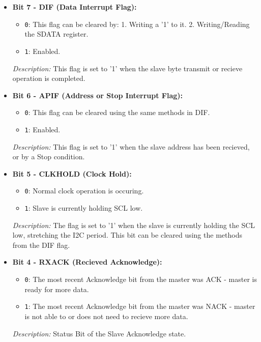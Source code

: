     
    \begin{itemize}
        \item \textbf{Bit 7 - DIF (Data Interrupt Flag):} 
        \begin{itemize}
            \item \texttt{0}: This flag can be cleared by: 1. Writing a '1' to it. 2. Writing/Reading the SDATA register.
            \item \texttt{1}: Enabled.
        \end{itemize}
        \textit{Description:} This flag is set to '1' when the slave byte transmit or recieve operation is completed.
        
        \item \textbf{Bit 6 - APIF (Address or Stop Interrupt Flag):} 
        \begin{itemize}
            \item \texttt{0}: This flag can be cleared using the same methods in DIF.
            \item \texttt{1}: Enabled.
        \end{itemize}
        \textit{Description:} This flag is set to '1' when the slave address has been recieved, or by a Stop condition. 
        
        \item \textbf{Bit 5 - CLKHOLD (Clock Hold):} 
        \begin{itemize}
            \item \texttt{0}: Normal clock operation is occuring.
            \item \texttt{1}: Slave is currently holding SCL low.
        \end{itemize}
        \textit{Description:} The flag is set to '1' when the slave is currently holding the SCL low, stretching the I2C period. This bit can be cleared using the methods from the DIF flag.
  
        \item \textbf{Bit 4 - RXACK (Recieved Acknowledge):} 
        \begin{itemize}
            \item \texttt{0}: The most recent Acknowledge bit from the master was ACK - master is ready for more data.
            \item \texttt{1}: The most recent Acknowledge bit from the master was NACK - master is not able to or does not need to recieve more data.
        \end{itemize}
        \textit{Description:} Status Bit of the Slave Acknowledge state.
  

\end{itemize}
